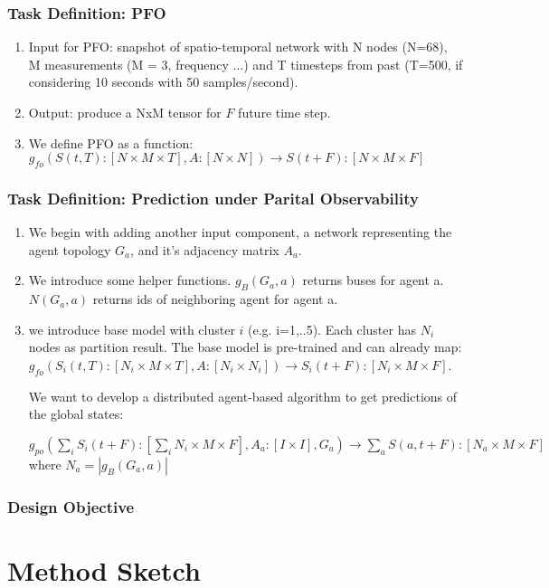 \documentclass{article}
\begin{document}
\subsubsection{Task Definition: PFO}  
\begin{enumerate}
    \item Input for PFO: snapshot of spatio-temporal network with N nodes (N=68), M measurements (M = 3, frequency ...) and T timesteps from past (T=500, if considering 10 seconds with 50 samples/second).  
    \item Output: produce a NxM tensor for $F$ future time step.
    \item We define PFO as a function: $g_{fo}(S(t, T): [ N \times M \times T ], A: [ N \times N ]) \rightarrow S(t+F): [ N \times M \times F]$
\end{enumerate}



\subsubsection{Task Definition: Prediction under Parital Observability}  
\begin{enumerate}
    \item We begin with adding another input component, a network representing the agent topology $G_a$, and it's adjacency matrix $A_a$.
    \item We introduce some helper functions. $g_B(G_a, a)$ returns buses for agent a.  $N(G_a, a)$ returns ids of neighboring agent for agent a. 
    \item we introduce base model with cluster $i$ (e.g. i=1,..5). Each cluster has $N_i$ nodes as partition result. 
    The base model is pre-trained and can
    already map:
    $g_{fo}(S_i(t, T): [ N_i \times M \times T ], A: [ N_i \times N_i ]) \rightarrow S_i(t+F): [ N_i \times M \times F]$.
    
    We want to develop a distributed agent-based algorithm to get predictions of the global states:
    
    
    
    $g_{po}(\sum_{i} S_i(t+F): [\sum_{i} N_i \times M \times F], A_a: [ I \times I ], G_a) \rightarrow \sum_{a} S(a, t+F): [ N_a \times M \times F]$ where $N_a = | g_B(G_a, a) |$
\end{enumerate}





\subsubsection{Design Objective}  

\section{Method Sketch}
\end{document}
